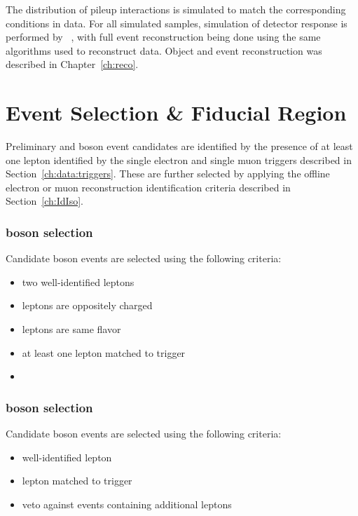 The distribution of pileup interactions is simulated to match the corresponding conditions in data. For all simulated samples, simulation of detector response is performed by \GEANTfour~\cite{Agostinelli:2002hh}, with full event reconstruction being done using the same algorithms used to reconstruct data. Object and event reconstruction was described in Chapter~\ref{ch:reco}. 




\section{Event Selection \& Fiducial Region}

Preliminary \Wpm and \Z boson event candidates are identified by the presence of at least one lepton identified by the single electron and single muon triggers described in Section~\ref{ch:data:triggers}. These are further selected by applying the offline electron or muon reconstruction identification criteria described in Section~\ref{ch:IdIso}. 
\subsubsection{\Z boson selection}
Candidate \Z boson events are selected using the following criteria:
\begin{itemize}
    \item two well-identified leptons
    \item leptons are oppositely charged
    \item leptons are same flavor 
    \item at least one lepton matched to trigger
    \item \masswindow
\end{itemize} 
\subsubsection{\W boson selection}
Candidate \W boson events are selected using the following criteria:
\begin{itemize}
    \item well-identified lepton
    \item lepton matched to trigger
    \item veto against events containing additional leptons
\end{itemize}


